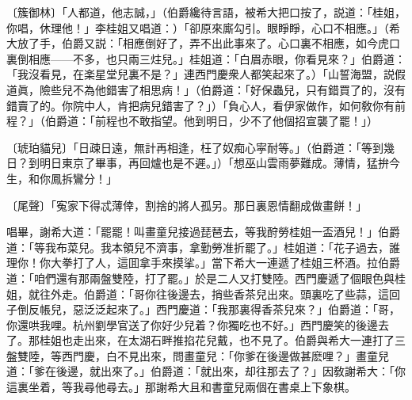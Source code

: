 \begin{myquote}
{\markfont〔簇御林〕}「人都道，他志誠，」{\markfont\small\color{mydarkgray}（伯爵纔待言語，被希大把口按了，説道：「桂姐，你唱，休理他！」李桂姐又唱道：）}「卻原來廝勾引。眼睜睜，心口不相應。」{\markfont\small\color{mydarkgray}（希大放了手，伯爵又説：「相應倒好了，弄不出此事來了。心口裏不相應，如今虎口裏倒相應——不多，也只兩三炷兒。」桂姐道：「白眉赤眼，你看見來？」伯爵道：「我沒看見，在楽星堂兒裏不是？」連西門慶衆人都笑起來了。）}「山誓海盟，説假道眞，險些兒不為他錯害了相思病！」{\markfont\small\color{mydarkgray}（伯爵道：「好保蟲兒，只有錯買了的，沒有錯賣了的。你院中人，肯把病兒錯害了？」）}「負心人，看伊家做作，如何敎你有前程？」{\markfont\small\color{mydarkgray}（伯爵道：「前程也不敢指望。他到明日，少不了他個招宣襲了罷！」）}

{\markfont〔琥珀貓兒〕}「日疎日遠，無計再相逢，枉了奴痴心寜耐等。」{\markfont\small\color{mydarkgray}（伯爵道：「等到幾日？到明日東京了畢事，再回爐也是不遲。」）}「想巫山雲雨夢難成。薄情，猛拚今生，和你鳳拆鸞分！」

{\markfont〔尾聲〕}「寃家下得忒薄倖，割捨的將人孤另。那日裏恩情翻成做畫餅！」
\end{myquote}

唱畢，謝希大道：「罷罷！叫畫童兒接過琵琶去，等我酧勞桂姐一盃酒兒！」伯爵道：「等我布菜兒。我本領兒不濟事，拿勤勞准折罷了。」桂姐道：「花子過去，誰理你！你大拳打了人，這囬拿手來摸挲。」當下希大一連遞了桂姐三杯酒。拉伯爵道：「咱們還有那兩盤雙陸，打了罷。」於是二人又打雙陸。西門慶遞了個眼色與桂姐，就往外走。伯爵道：「哥你往後邊去，捎些香茶兒出來。頭裏吃了些蒜，這回子倒反帳兒，惡泛泛起來了。」西門慶道：「我那裏得香茶兒來？」伯爵道：「哥，你還哄我哩。杭州劉學官送了你好少兒着？你獨吃也不好。」西門慶笑的後邊去了。那桂姐也走出來，在太湖石畔推掐花兒戴，也不見了。伯爵與希大一連打了三盤雙陸，等西門慶，白不見出來，問畫童兒：「你爹在後邊做甚麽哩？」畫童兒道：「爹在後邊，就出來了。」伯爵道：「就出來，却往那去了？」因敎謝希大：「你這裏坐着，等我尋他尋去。」那謝希大且和書童兒兩個在書桌上下象棋。

